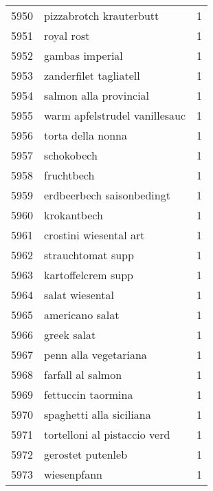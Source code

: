 \begin{tabular}{llr}
5950 &                            pizzabrotch krauterbutt &      1 \\
5951 &                                         royal rost &      1 \\
5952 &                                    gambas imperial &      1 \\
5953 &                             zanderfilet tagliatell &      1 \\
5954 &                             salmon alla provincial &      1 \\
5955 &                      warm apfelstrudel vanillesauc &      1 \\
5956 &                                  torta della nonna &      1 \\
5957 &                                         schokobech &      1 \\
5958 &                                         fruchtbech &      1 \\
5959 &                          erdbeerbech saisonbedingt &      1 \\
5960 &                                        krokantbech &      1 \\
5961 &                             crostini wiesental art &      1 \\
5962 &                                  strauchtomat supp &      1 \\
5963 &                                 kartoffelcrem supp &      1 \\
5964 &                                    salat wiesental &      1 \\
5965 &                                    americano salat &      1 \\
5966 &                                        greek salat &      1 \\
5967 &                              penn alla vegetariana &      1 \\
5968 &                                  farfall al salmon &      1 \\
5969 &                                 fettuccin taormina &      1 \\
5970 &                           spaghetti alla siciliana &      1 \\
5971 &                       tortelloni al pistaccio verd &      1 \\
5972 &                                  gerostet putenleb &      1 \\
5973 &                                        wiesenpfann &      1 \\

\end{tabular}
